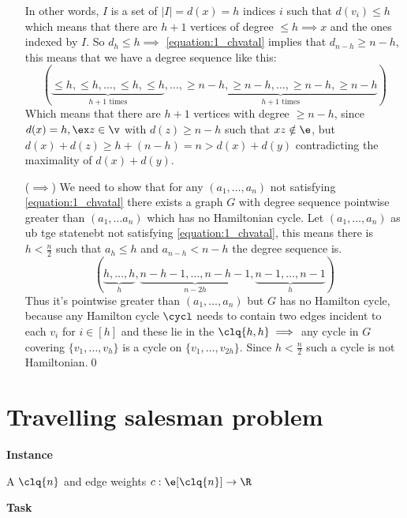 \begin{prf}
\begin{itemize}
        In other words, $I$ is a set of $|I| = d(x) = h$ indices $i$ such that $d(v_i) \leq h$ which means that there are $h + 1$ vertices of degree $\leq h \implies x $ and the ones indexed by $I$. So $d_h \leq h \implies$ \ref{equation:1_chvatal} implies that $d_{n - h} \geq n - h$, this means that we have a degree sequence like this:
        \begin{equation*}
            (\underbrace{\leq h, \leq h, \dots, \leq h, \leq h}_\text{$h + 1$ times}, \dots, \underbrace{\geq n - h, \geq n - h, \dots, \geq n - h, \geq n - h}_\text{$h + 1$ times})
        \end{equation*}
        Which means that there are $h + 1$ vertices with degree $\geq n - h$, since $d(x) = h, \ex z \in \v$ with $d(z) \geq n - h$ such that $xz \notin \e$, but $d(x) + d(z) \geq h + (n - h) = n > d(x) + d(y)$ contradicting the maximality of $d(x) + d(y)$.
        \item[($\implies$)] We need to show that for any $(a_1, \dots, a_n)$ not satisfying \ref{equation:1_chvatal} there exists a graph $G$ with degree sequence pointwise greater than $(a_1, \dots a_n)$ which has no Hamiltonian cycle. Let $(a_1, \dots, a_n)$ as ub tge statenebt not satisfying \ref{equation:1_chvatal}, this means there is $h < \frac{n}{2}$ such that $a_h \leq h$ and $a_{n - h} < n - h$ the degree sequence is.
        \begin{equation*}
            (
                \underbrace{h, \dots, h}_{h},
                \underbrace{n - h - 1, \dots, n - h - 1}_{n - 2h},
                \underbrace{n - 1, \dots, n - 1}_{h}
            )
        \end{equation*}
        Thus it's pointwise greater than $(a_1, \dots, a_n)$ but $G$ has no Hamilton cycle, because any Hamilton cycle $\cycl$ needs to contain two edges incident to each $v_i$ for $i \in [h]$ and these lie in the $\clq{h,h} \implies$ any cycle in $G$ covering $\{v_1, \dots, v_h\}$ is a cycle on $\{v_1, \dots, v_{2h}\}$. Since $h < \frac{n}{2}$ such a cycle is not Hamiltonian.\qed
    \end{itemize}
\end{prf}
\section{Travelling salesman problem}
\textbf{Instance}

A $\clq{n}$ and edge weights $c: \e[\clq{n}] \rightarrow \R$

\noindent\textbf{Task}

